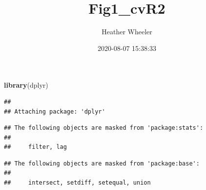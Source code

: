 \documentclass[]{article}
\title{Fig1\_cvR2}
\author{Heather Wheeler}
\date{2020-08-07 15:38:33}
\newenvironment{Shaded}{\begin{snugshade}}{\end{snugshade}}
\newcommand{\KeywordTok}[1]{\textcolor[rgb]{0.13,0.29,0.53}{\textbf{#1}}}
\newcommand{\NormalTok}[1]{#1}
\begin{document}
\maketitle

\begin{Shaded}
\begin{Highlighting}[]
\KeywordTok{library}\NormalTok{(dplyr)}
\end{Highlighting}
\end{Shaded}

\begin{verbatim}
## 
## Attaching package: 'dplyr'
\end{verbatim}

\begin{verbatim}
## The following objects are masked from 'package:stats':
## 
##     filter, lag
\end{verbatim}

\begin{verbatim}
## The following objects are masked from 'package:base':
## 
##     intersect, setdiff, setequal, union
\end{verbatim}
\end{document}
